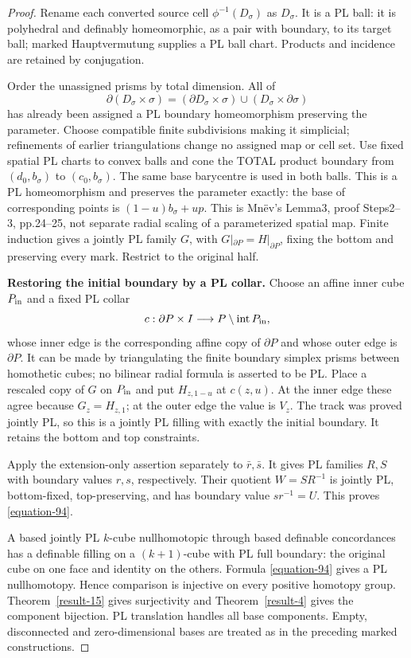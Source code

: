\documentclass[11pt,a4paper]{article}
\theoremstyle{definition}
\begin{document}
\begin{proof}
Rename each converted source cell $\phi^{-1}(D_\sigma)$
as $D_\sigma$. It is a PL ball: it is polyhedral and
definably homeomorphic, as a pair with boundary, to its
target ball; marked Hauptvermutung supplies a PL ball
chart. Products and incidence are retained by conjugation.

Order the unassigned prisms by total dimension. All of
\[
 \partial(D_\sigma\times\sigma)
 =(\partial D_\sigma\times\sigma)\cup
                      (D_\sigma\times\partial\sigma)
\]
has already been assigned a PL boundary homeomorphism
preserving the parameter. Choose compatible finite
subdivisions making it simplicial; refinements of earlier
triangulations change no assigned map or cell set.
Use fixed spatial PL charts to convex balls and cone
the TOTAL product boundary from $(d_0,b_\sigma)$ to
$(c_0,b_\sigma)$. The same base barycentre is used in
both balls. This is a PL homeomorphism and preserves
the parameter exactly: the base of corresponding points
is $(1-u)b_\sigma+up$. This is Mn\"ev's Lemma3,
proof Steps2--3, pp.24--25, not separate radial scaling
of a parameterized spatial map.
Finite induction gives a jointly PL family $G$, with
$G|_{\partial P}=H|_{\partial P}$, fixing the bottom
and preserving every mark. Restrict to the original half.

\textbf{Restoring the initial boundary by a PL collar.}\quad
Choose an affine inner cube $P_{\rm in}$ and a fixed PL
collar
\[
 c:\partial P\times I\longrightarrow
                    P\setminus\operatorname{int}P_{\rm in},
\]
whose inner edge is the corresponding affine copy of
$\partial P$ and whose outer edge is $\partial P$.
It can be made by triangulating the finite boundary
simplex prisms between homothetic cubes; no bilinear
radial formula is asserted to be PL.
Place a rescaled copy of $G$ on $P_{\rm in}$ and put
$H_{z,1-u}$ at $c(z,u)$. At the inner edge these agree
because $G_z=H_{z,1}$; at the outer edge the value is
$V_z$. The track was proved jointly PL, so this is
a jointly PL filling with exactly the initial boundary.
It retains the bottom and top constraints.

Apply the extension-only assertion separately to
$\bar r,\bar s$. It gives PL families $R,S$ with
boundary values $r,s$, respectively. Their quotient
$W=SR^{-1}$ is jointly PL, bottom-fixed, top-preserving,
and has boundary value $sr^{-1}=U$. This proves \eqref{equation-94}.

A based jointly PL $k$-cube nullhomotopic through based
definable concordances has a definable filling on a
$(k+1)$-cube with PL full boundary: the original cube
on one face and identity on the others. Formula \eqref{equation-94}
gives a PL nullhomotopy. Hence comparison is injective
on every positive homotopy group. Theorem~\ref{result-15} gives
surjectivity and Theorem~\ref{result-4} gives the component bijection.
PL translation handles all base components.
Empty, disconnected and zero-dimensional bases are
treated as in the preceding marked constructions.
\end{proof}
\end{document}
